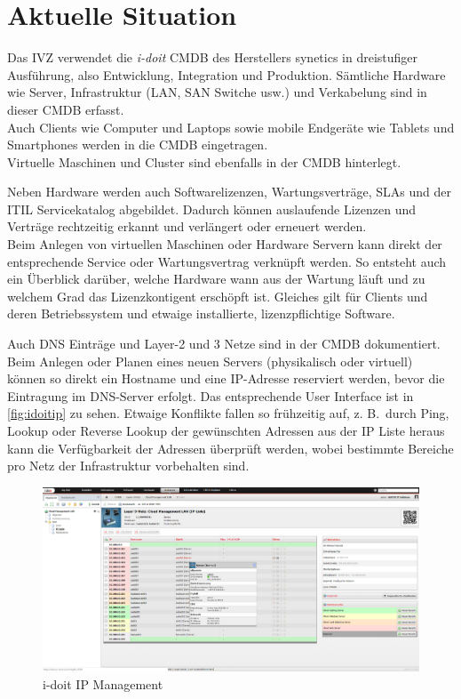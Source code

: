 \section{Aktuelle Situation}
Das \acs{IVZ} verwendet die \textit{i-doit} \acs{CMDB} des Herstellers synetics in dreistufiger Ausführung, also Entwicklung, Integration und Produktion.
Sämtliche Hardware wie Server, Infrastruktur (\acf{LAN}, \acf{SAN} Switche usw.) und Verkabelung sind in dieser \acs{CMDB} erfasst.\\
Auch Clients wie Computer und Laptops sowie mobile Endgeräte wie Tablets und Smartphones werden in die \acs{CMDB} eingetragen.\\
Virtuelle Maschinen und Cluster sind ebenfalls in der \acs{CMDB} hinterlegt.

Neben Hardware werden auch Softwarelizenzen, Wartungsverträge, \acfp{SLA} und der \acf{ITIL} Servicekatalog abgebildet. Dadurch können auslaufende Lizenzen und Verträge rechtzeitig erkannt und verlängert oder erneuert werden.\\
Beim Anlegen von virtuellen Maschinen oder Hardware Servern kann direkt der entsprechende Service oder Wartungsvertrag verknüpft werden. So entsteht auch ein Überblick darüber, welche Hardware wann aus der Wartung läuft und zu welchem Grad das Lizenzkontigent erschöpft ist. Gleiches gilt für Clients und deren Betriebssystem und etwaige installierte, lizenzpflichtige Software.

Auch \acf{DNS} Einträge und Layer-2 und 3 Netze sind in der \acs{CMDB} dokumentiert. Beim Anlegen oder Planen eines neuen Servers (physikalisch oder virtuell) können so direkt ein Hostname und eine IP-Adresse reserviert werden, bevor die Eintragung im \acs{DNS}-Server erfolgt. Das entsprechende User Interface ist in \autoref{fig:idoitip} zu sehen. Etwaige Konflikte fallen so frühzeitig auf, z. B.~durch Ping, Lookup oder Reverse Lookup der gewünschten Adressen aus der IP Liste heraus kann die Verfügbarkeit der Adressen überprüft werden, wobei bestimmte Bereiche pro Netz der Infrastruktur vorbehalten sind.

\begin{figure}[H]
  \centering
  \includegraphics[width=\textwidth]{Anhang/idoitip}
  \caption{i-doit IP Management}
\label{fig:idoitip}
\end{figure}

